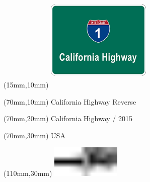 \null\newpage
\begin{textblock*}{50mm}(15mm,10mm)%
\includegraphics[width=50mm]{LG/CAL.png}
\end{textblock*}
\begin{textblock*}{130mm}(70mm,10mm)%
{\fontsize{20}{20}\selectfont California Highway Reverse}\\
\end{textblock*}
\begin{textblock*}{120mm}(70mm,20mm)%
{\fontsize{16}{16}\selectfont California Highway / 2015}\\
\end{textblock*}
\begin{textblock*}{120mm}(70mm,30mm)%
{\fontsize{12}{12}\selectfont USA}
\end{textblock*}
\begin{textblock*}{30mm}(110mm,30mm)%
\centering
\includegraphics[height=15mm]{icons/tofinish.pdf}
\end{textblock*}
